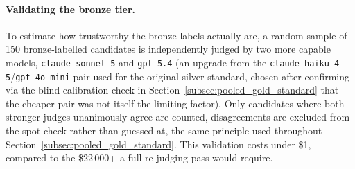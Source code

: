 \documentclass[a4paper,oneside,bibliography=totoc]{scrbook}
\begin{document}
\paragraph{Validating the bronze tier.} To estimate how trustworthy the bronze labels actually are, a random sample of 150 bronze-labelled candidates is independently judged by two more capable models, \texttt{claude-sonnet-5} and \texttt{gpt-5.4} (an upgrade from the \texttt{claude-haiku-4-5}/\texttt{gpt-4o-mini} pair used for the original silver standard, chosen after confirming via the blind calibration check in Section~\ref{subsec:pooled_gold_standard} that the cheaper pair was not itself the limiting factor). Only candidates where both stronger judges unanimously agree are counted, disagreements are excluded from the spot-check rather than guessed at, the same principle used throughout Section~\ref{subsec:pooled_gold_standard}. This validation costs under \$1, compared to the \$22\,000+ a full re-judging pass would require.

\label{subsec:active_learning}
\end{document}
